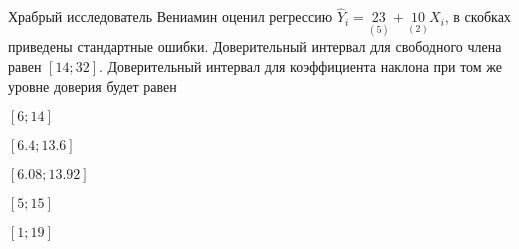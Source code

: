 
\begin{question}
Храбрый исследователь Вениамин оценил регрессию
\(\hat Y_i = \underset{(5)}{23} + \underset{(2)}{10}X_i\), в скобках
приведены стандартные ошибки. Доверительный интервал для свободного
члена равен \([14; 32]\). Доверительный интервал для коэффициента
наклона при том же уровне доверия будет равен
\begin{answerlist}
  \item \([6; 14]\)
  \item \([6.4; 13.6]\)
  \item \([6.08; 13.92]\)
  \item \([5; 15]\)
  \item \([1; 19]\)
\end{answerlist}
\end{question}


